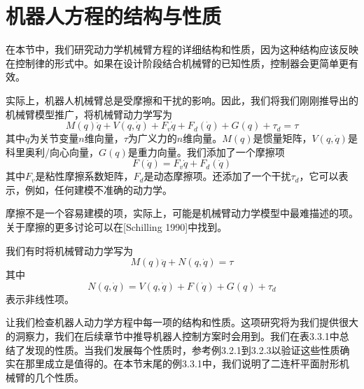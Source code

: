 \documentclass[12pt,a4paper]{ctexart}
\begin{document}
\section{机器人方程的结构与性质}

在本节中，我们研究动力学机械臂方程的详细结构和性质，因为这种结构应该反映在控制律的形式中。如果在设计阶段结合机械臂的已知性质，控制器会更简单更有效。

实际上，机器人机械臂总是受摩擦和干扰的影响。因此，我们将我们刚刚推导出的机械臂模型推广，将机械臂动力学写为
\begin{equation}
M(q)\ddot{q} + V(q,\dot{q}) + F_v\dot{q} + F_d(\dot{q}) + G(q) + \tau_d = \tau
\end{equation}
其中$q$为关节变量$n$维向量，$\tau$为广义力的$n$维向量。$M(q)$是惯量矩阵，$V(q,\dot{q})$是科里奥利/向心向量，$G(q)$是重力向量。我们添加了一个摩擦项
\begin{equation}
F(\dot{q}) = F_v\dot{q} + F_d(\dot{q})
\end{equation}
其中$F_v$是粘性摩擦系数矩阵，$F_d$是动态摩擦项。还添加了一个干扰$\tau_d$，它可以表示，例如，任何建模不准确的动力学。

摩擦不是一个容易建模的项，实际上，可能是机械臂动力学模型中最难描述的项。关于摩擦的更多讨论可以在[Schilling 1990]中找到。

我们有时将机械臂动力学写为
\begin{equation}
M(q)\ddot{q} + N(q,\dot{q}) = \tau
\end{equation}
其中
\begin{equation}
N(q,\dot{q}) = V(q,\dot{q}) + F(\dot{q}) + G(q) + \tau_d
\end{equation}
表示非线性项。

让我们检查机器人动力学方程中每一项的结构和性质。这项研究将为我们提供很大的洞察力，我们在后续章节中推导机器人控制方案时会用到。我们在表3.3.1中总结了发现的性质。当我们发展每个性质时，参考例3.2.1到3.2.3以验证这些性质确实在那里成立是值得的。在本节末尾的例3.3.1中，我们说明了二连杆平面肘形机械臂的几个性质。
\end{document}
